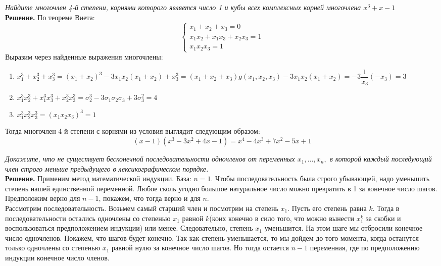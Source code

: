 \documentclass[a4paper, 12pt]{article}
\begin{document}
\begin{spacing}{1}
\begin{center}
\end{center}

\noindent \textit{Найдите многочлен 4-й степени, корнями которого является число 1 и кубы всех комплексных корней многочлена $x^3+x-1$}\\
\noindent \textbf{Решение.} По теореме Виета:
$$
\begin{cases} x_1 + x_2 + x_3 = 0\\[12pt]
x_1 x_2 + x_1 x_3 + x_2 x_3 = 1\\[12pt]
x_1 x_2 x_3 = 1
\end{cases}
$$
Выразим через найденные выражения многочлены:
\begin{enumerate}
	\item $x_1^3+x_2^3+x_3^3=(x_1+x_2)^3-3x_1x_2(x_1+x_2) + x_3^3 =(x_1+x_2+x_3)g(x_1,x_2,x_3) -3x_1x_2(x_1+x_2)=-3\dfrac{1}{x_3}(-x_3) = 3$
	\item $x_1^3x_2^3+x_1^3x_3^3+x_2^3x_3^3 = \sigma_2^3-3\sigma_1\sigma_2\sigma_3+3\sigma_3^2=4$
	\item $x_1^3x_2^3x_3^3=(x_1x_2x_3)^3=1$
\end{enumerate}
Тогда многочлен 4-й степени с корнями из условия выглядит следующим образом: $$
(x-1)(x^3-3x^2+4x-1) = x^4 - 4 x^3 + 7 x^2 - 5 x + 1
$$









\begin{center}
\end{center}

\noindent \textit{Докажите, что не существует бесконечной последовательности одночленов от переменных $x_1, ..., x_n,$ в которой каждый последующий член строго меньше предыдущего в лексикографическом порядке.}\\
\noindent \textbf{Решение.} Применим метод математической индукции. База: $n = 1$. Чтобы последовательность была строго убывающей, надо уменьшить степень нашей единственной переменной. Любое сколь угодно большое натуральное число можно превратить в 1 за конечное число шагов.\\
Предположим верно для $n - 1$, покажем, что тогда верно и для $n$.\\
Рассмотрим последовательность. Возьмем самый старший член и посмотрим на степень $x_1$. Пусть его степень равна $k$. Тогда в последовательности остались одночлены со степенью $x_1$ равной $k$(коих конечно в сило того, что можно вынести $x_1^k$ за скобки и воспользоваться предположением индукции) или менее. Следовательно, степень $x_1$ уменьшится. На этом шаге мы отбросили конечное число одночленов. Покажем, что шагов будет конечно. Так как степень уменьшается, то мы дойдем до того момента, когда останутся только одночлены со степенью $x_1$ равной нулю за конечное число шагов. Но тогда остается $n - 1$ переменная, где по предположению индукции конечное число членов.





\end{spacing}
\end{document}

